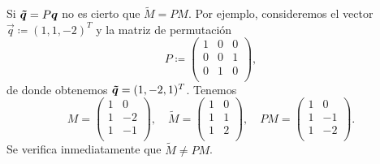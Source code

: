 \begin{observation}
	Si $\boldsymbol{\tilde{q}} = P\boldsymbol{q}$ no es cierto que $\tilde{M} = PM$. Por ejemplo, consideremos el vector
	$\vec{q} \coloneq (1, 1, -2)^T$ y la matriz de permutación
	\begin{equation*}
		P \coloneq \begin{pmatrix}
			1 & 0 & 0 \\
			0 & 0 & 1 \\
			0 & 1 & 0 \\
		\end{pmatrix},
	\end{equation*}
	de donde obtenemos $\boldsymbol{\tilde{q}} = (1, -2, 1)^T$. Tenemos
	\begin{equation*}
		M = \begin{pmatrix}
			1 & 0 \\
			1 & -2 \\
			1 & -1 \\
		\end{pmatrix}, \quad
		\tilde{M} = \begin{pmatrix}
			1 & 0 \\
			1 & 1 \\
			1 & 2 \\
		\end{pmatrix}, \quad
		PM = \begin{pmatrix}
			1 & 0 \\
			1 & -1 \\
			1 & -2 \\
		\end{pmatrix}.
	\end{equation*}
	Se verifica inmediatamente que $\tilde{M} \neq PM$.
\end{observation}

